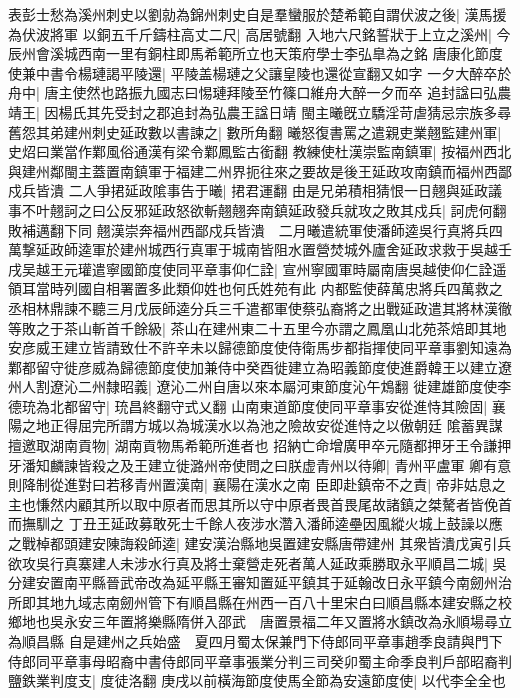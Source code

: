 表彭士愁為溪州刺史以劉勍為錦州刺史自是羣蠻服於楚希範自謂伏波之後|{
	漢馬援為伏波將軍}
以銅五千斤鑄柱高丈二尺|{
	高居號翻}
入地六尺銘誓狀于上立之溪州|{
	今辰州會溪城西南一里有銅柱即馬希範所立也天策府學士李弘臯為之銘}
唐康化節度使兼中書令楊璉謁平陵還|{
	平陵盖楊璉之父讓皇陵也還從宣翻又如字}
一夕大醉卒於舟中|{
	唐主使然也路振九國志曰惕璉拜陵至竹篠口維舟大醉一夕而卒}
追封諡曰弘農靖王|{
	因楊氏其先受封之郡追封為弘農王諡日靖}
閩主曦旣立驕淫苛虐猜忌宗族多尋舊怨其弟建州刺史延政數以書諫之|{
	數所角翻}
曦怒復書罵之遣親吏業翹監建州軍|{
	史炤曰業當作鄴風俗通漢有梁令鄴鳳監古銜翻}
教練使杜漢崇監南鎮軍|{
	按福州西北與建州鄰閩主蓋置南鎮軍于福建二州界扼往來之要故是後王延政攻南鎮而福州西鄙戍兵皆潰}
二人爭捃延政隂事告于曦|{
	捃君運翻}
由是兄弟積相猜恨一日翹與延政議事不叶翹訶之曰公反邪延政怒欲斬翹翹奔南鎮延政發兵就攻之敗其戍兵|{
	訶虎何翻敗補邁翻下同}
翹漢崇奔福州西鄙戍兵皆潰　二月曦遣統軍使潘師逵吳行真將兵四萬撃延政師逵軍於建州城西行真軍于城南皆阻水置營焚城外廬舍延政求救于吳越壬戌吴越王元瓘遣寧國節度使同平章事仰仁詮|{
	宣州寧國軍時屬南唐吳越使仰仁詮遥領耳當時列國自相署置多此類仰姓也何氏姓苑有此}
内都監使薛萬忠將兵四萬救之丞相林鼎諫不聽三月戊辰師逵分兵三千遣都軍使蔡弘裔將之出戰延政遣其將林漢徹等敗之于茶山斬首千餘級|{
	茶山在建州東二十五里今亦謂之鳳凰山北苑茶焙即其地}
安彦威王建立皆請致仕不許辛未以歸德節度使侍衛馬步都指揮使同平章事劉知遠為鄴都留守徙彦威為歸德節度使加兼侍中癸酉徙建立為昭義節度使進爵韓王以建立遼州人割遼沁二州隸昭義|{
	遼沁二州自唐以來本屬河東節度沁午鴆翻}
徙建雄節度使李德珫為北都留守|{
	珫昌終翻守式乂翻}
山南東道節度使同平章事安從進恃其險固|{
	襄陽之地正得屈完所謂方城以為城漢水以為池之險故安從進恃之以傲朝廷}
隂蓄異謀擅邀取湖南貢物|{
	湖南貢物馬希範所進者也}
招納亡命增廣甲卒元隨都押牙王令謙押牙潘知麟諫皆殺之及王建立徙潞州帝使問之曰朕虚青州以待卿|{
	青州平盧軍}
卿有意則降制從進對曰若移青州置漢南|{
	襄陽在漢水之南}
臣即赴鎮帝不之責|{
	帝非姑息之主也慊然内顧其所以取中原者而思其所以守中原者畏首畏尾故諸鎮之桀驁者皆俛首而撫馴之}
丁丑王延政募敢死士千餘人夜涉水濳入潘師逵壘因風縱火城上鼓譟以應之戰棹都頭建安陳誨殺師逵|{
	建安漢治縣地吳置建安縣唐帶建州}
其衆皆潰戊寅引兵欲攻吳行真寨建人未涉水行真及將士棄營走死者萬人延政乘勝取永平順昌二城|{
	吳分建安置南平縣晉武帝改為延平縣王審知置延平鎮其于延翰改日永平鎮今南劒州治所即其地九域志南劒州管下有順昌縣在州西一百八十里宋白曰順昌縣本建安縣之校鄉地也吳永安三年置將樂縣隋併入邵武　唐置景福二年又置將水鎮改為永順場尋立為順昌縣}
自是建州之兵始盛　夏四月蜀太保兼門下侍郎同平章事趙季良請與門下侍郎同平章事母昭裔中書侍郎同平章事張業分判三司癸卯蜀主命季良判戶部昭裔判鹽鉄業判度支|{
	度徒洛翻}
庚戌以前橫海節度使馬全節為安遠節度使|{
	以代李全全也}
